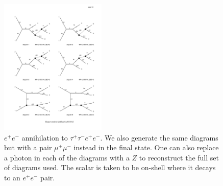 \begin{figure}[h]
    \includegraphics[width=0.45\textwidth,clip=true,viewport=65 550 315 730,page=2]{Figures/madgraph_diagrams/ee_tautauee_scalar.pdf}
    \caption[$e^+ e^-$ annihilation to $\tau^+ \tau^- e^+ e^-$.]{$e^+ e^-$ annihilation to $\tau^+ \tau^- e^+ e^-$. We also generate the same diagrams but with a pair $\mu^+ \mu^-$ instead in the final state. One can also replace a photon in each of the diagrams with a $Z$ to reconstruct the full set of diagrams used. The scalar is taken to be on-shell where it decays to an $e^+ e^-$ pair.}
    \label{fig:ee_tautauee_scalar}
\end{figure}
